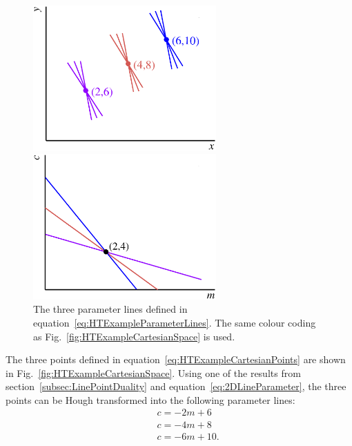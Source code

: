 \begin{figure}
  \centering
  \parbox{7cm}{
    \includegraphics[width=7cm]{images/hough_transform/HT_example_cartesian_space}
    \caption{The three cartesian points defined in equation~\ref{eq:HTExampleCartesianPoints}.  The colour coding matches that of Fig.~\ref{fig:HTExampleParameterSpace}.}
    \label{fig:HTExampleCartesianSpace}}
    \qquad
    \begin{minipage}{7cm}
      \includegraphics[width=7cm]{images/hough_transform/HT_example_parameter_space}
      \caption{The three parameter lines defined in equation~\ref{eq:HTExampleParameterLines}.  The same colour coding as Fig.~\ref{fig:HTExampleCartesianSpace} is used.}
      \label{fig:HTExampleParameterSpace}
    \end{minipage}
\end{figure}
The three points defined in equation~\ref{eq:HTExampleCartesianPoints} are shown in Fig.~\ref{fig:HTExampleCartesianSpace}.  Using one of the results from section~\ref{subsec:LinePointDuality} and equation~\ref{eq:2DLineParameter}, the three points can be Hough transformed into the following parameter lines:
\begin{equation}
  \begin{split}
    &\quad c = -2m + 6 \\
    &\quad c = -4m + 8 \\
    &\quad c = -6m + 10.
  \end{split}
  \label{eq:HTExampleParameterLines}
\end{equation}
